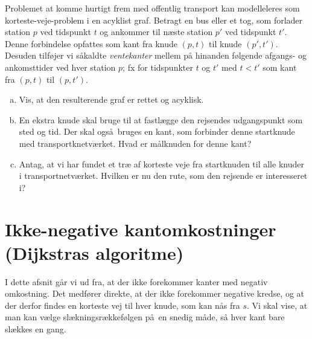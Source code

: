 {\begin{exerc}
  Problemet at komme hurtigt frem med offentlig transport kan modelleleres som korteste-veje-problem i en acyklist graf.
  Betragt en bus eller et tog, som forlader station $p$ ved tidspunkt $t$ og ankommer til næste station $p'$ ved tidspunkt $t'$.
  Denne forbindelse opfattes som kant fra knude $(p,t)$ til knude $(p',t')$.
  Desuden tilføjer vi såkaldte \emph{ventekanter} mellem på hinanden følgende afgangs- og ankomsttider ved hver station $p$; fx for tidspunkter $t$ og $t'$ med $t<t'$ som kant fra $(p,t)$ til $(p,t')$.
  \begin{enumerate}[(a)]
    \item Vis, at den resulterende graf er rettet og acyklisk.
    \item En ekstra knude skal bruge til at fastlægge den rejsendes udgangspunkt som sted og tid.
      Der skal også bruges en kant, som forbinder denne startknude med transportknetværket.
      Hvad er målknuden for denne kant?
    \item Antag, at vi har fundet et træ af korteste veje fra startknuden til alle knuder i transportnetværket.
      Hvilken er nu den rute, som den rejsende er interesseret i?
  \end{enumerate}
\end{exerc}


\section{Ikke-negative kantomkostninger (Dijkstras algoritme)}
%
%
%
%

I dette afsnit går vi ud fra, at der ikke forekommer kanter med negativ omkostning.
Det medfører direkte, at der ikke forekommer negative kredse, og at der derfor findes en korteste vej til hver knude, som kan nås fra $s$.
Vi skal vise, at man kan vælge slækningsrækkefølgen på en snedig måde, så hver kant bare slækkes en gang.

}
